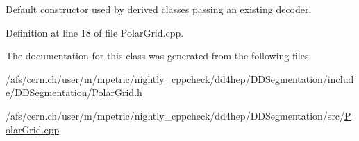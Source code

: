 Default constructor used by derived classes passing an existing decoder. 

Definition at line 18 of file PolarGrid.cpp.

The documentation for this class was generated from the following files:\begin{DoxyCompactItemize}
\item 
/afs/cern.ch/user/m/mpetric/nightly\_\-cppcheck/dd4hep/DDSegmentation/include/DDSegmentation/\hyperlink{_polar_grid_8h}{PolarGrid.h}\item 
/afs/cern.ch/user/m/mpetric/nightly\_\-cppcheck/dd4hep/DDSegmentation/src/\hyperlink{_polar_grid_8cpp}{PolarGrid.cpp}\end{DoxyCompactItemize}
